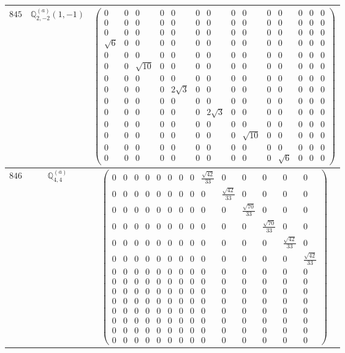 \documentclass[fleqn,8pt,landscape]{jsarticle}
\begin{document}
\begin{center}
\begin{longtable}{ccc}
$ 845 $ & $ \mathbb{Q}_{2,-2}^{(a)}(1,-1) $ & $ \begin{pmatrix} 0 & 0 & 0 & 0 & 0 & 0 & 0 & 0 & 0 & 0 & 0 & 0 & 0 & 0 \\ 0 & 0 & 0 & 0 & 0 & 0 & 0 & 0 & 0 & 0 & 0 & 0 & 0 & 0 \\ 0 & 0 & 0 & 0 & 0 & 0 & 0 & 0 & 0 & 0 & 0 & 0 & 0 & 0 \\ \sqrt{6} & 0 & 0 & 0 & 0 & 0 & 0 & 0 & 0 & 0 & 0 & 0 & 0 & 0 \\ 0 & 0 & 0 & 0 & 0 & 0 & 0 & 0 & 0 & 0 & 0 & 0 & 0 & 0 \\ 0 & 0 & \sqrt{10} & 0 & 0 & 0 & 0 & 0 & 0 & 0 & 0 & 0 & 0 & 0 \\ 0 & 0 & 0 & 0 & 0 & 0 & 0 & 0 & 0 & 0 & 0 & 0 & 0 & 0 \\ 0 & 0 & 0 & 0 & 2 \sqrt{3} & 0 & 0 & 0 & 0 & 0 & 0 & 0 & 0 & 0 \\ 0 & 0 & 0 & 0 & 0 & 0 & 0 & 0 & 0 & 0 & 0 & 0 & 0 & 0 \\ 0 & 0 & 0 & 0 & 0 & 0 & 2 \sqrt{3} & 0 & 0 & 0 & 0 & 0 & 0 & 0 \\ 0 & 0 & 0 & 0 & 0 & 0 & 0 & 0 & 0 & 0 & 0 & 0 & 0 & 0 \\ 0 & 0 & 0 & 0 & 0 & 0 & 0 & 0 & \sqrt{10} & 0 & 0 & 0 & 0 & 0 \\ 0 & 0 & 0 & 0 & 0 & 0 & 0 & 0 & 0 & 0 & 0 & 0 & 0 & 0 \\ 0 & 0 & 0 & 0 & 0 & 0 & 0 & 0 & 0 & 0 & \sqrt{6} & 0 & 0 & 0 \end{pmatrix} $ \\ \hline
$ 846 $ & $ \mathbb{Q}_{4,4}^{(a)} $ & $ \begin{pmatrix} 0 & 0 & 0 & 0 & 0 & 0 & 0 & 0 & \frac{\sqrt{42}}{33} & 0 & 0 & 0 & 0 & 0 \\ 0 & 0 & 0 & 0 & 0 & 0 & 0 & 0 & 0 & \frac{\sqrt{42}}{33} & 0 & 0 & 0 & 0 \\ 0 & 0 & 0 & 0 & 0 & 0 & 0 & 0 & 0 & 0 & \frac{\sqrt{70}}{33} & 0 & 0 & 0 \\ 0 & 0 & 0 & 0 & 0 & 0 & 0 & 0 & 0 & 0 & 0 & \frac{\sqrt{70}}{33} & 0 & 0 \\ 0 & 0 & 0 & 0 & 0 & 0 & 0 & 0 & 0 & 0 & 0 & 0 & \frac{\sqrt{42}}{33} & 0 \\ 0 & 0 & 0 & 0 & 0 & 0 & 0 & 0 & 0 & 0 & 0 & 0 & 0 & \frac{\sqrt{42}}{33} \\ 0 & 0 & 0 & 0 & 0 & 0 & 0 & 0 & 0 & 0 & 0 & 0 & 0 & 0 \\ 0 & 0 & 0 & 0 & 0 & 0 & 0 & 0 & 0 & 0 & 0 & 0 & 0 & 0 \\ 0 & 0 & 0 & 0 & 0 & 0 & 0 & 0 & 0 & 0 & 0 & 0 & 0 & 0 \\ 0 & 0 & 0 & 0 & 0 & 0 & 0 & 0 & 0 & 0 & 0 & 0 & 0 & 0 \\ 0 & 0 & 0 & 0 & 0 & 0 & 0 & 0 & 0 & 0 & 0 & 0 & 0 & 0 \\ 0 & 0 & 0 & 0 & 0 & 0 & 0 & 0 & 0 & 0 & 0 & 0 & 0 & 0 \\ 0 & 0 & 0 & 0 & 0 & 0 & 0 & 0 & 0 & 0 & 0 & 0 & 0 & 0 \\ 0 & 0 & 0 & 0 & 0 & 0 & 0 & 0 & 0 & 0 & 0 & 0 & 0 & 0 \end{pmatrix} $ \\ \hline

\end{longtable}
\end{center}
\end{document}
